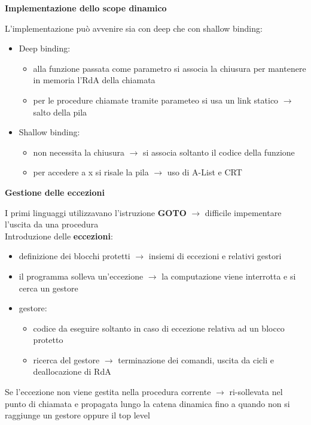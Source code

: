 \documentclass{article}
\begin{document}
\begin{flushleft}
\medskip

\textbf{Implementazione dello scope dinamico}

L'implementazione può avvenire sia con deep che con shallow binding:

\begin{itemize}
    \item Deep binding: 
    \begin{itemize}
        \item alla funzione passata come parametro si associa la chiusura per mantenere in memoria l'RdA della chiamata
        \item per le procedure chiamate tramite parameteo si usa un link statico $\rightarrow$ salto della pila
    \end{itemize}
    \item Shallow binding: 
    \begin{itemize}
        \item non necessita la chiusura $\rightarrow$ si associa soltanto il codice della funzione
        \item per accedere a x si risale la pila $\rightarrow$ uso di A-List e CRT
    \end{itemize}
\end{itemize}

\medskip

\textbf{Gestione delle eccezioni}

I primi linguaggi utilizzavano l'istruzione \textbf{GOTO} $\rightarrow$ difficile impementare l'uscita da una procedura \\
Introduzione delle \textbf{eccezioni}:

\begin{itemize}
    \item definizione dei blocchi protetti $\rightarrow$ insiemi di eccezioni e relativi gestori
    \item il programma solleva un'eccezione $\rightarrow$ la computazione viene interrotta e si cerca un gestore
    \item gestore: 
    \begin{itemize}
        \item codice da eseguire soltanto in caso di eccezione relativa ad un blocco protetto
        \item ricerca del gestore $\rightarrow$ terminazione dei comandi, uscita da cicli e deallocazione di RdA
    \end{itemize}
\end{itemize}

Se l'eccezione non viene gestita nella procedura corrente $\rightarrow$ ri-sollevata nel punto di chiamata e propagata lungo la 
catena dinamica fino a quando non si raggiunge un gestore oppure il top level

\end{flushleft}
\end{document}
